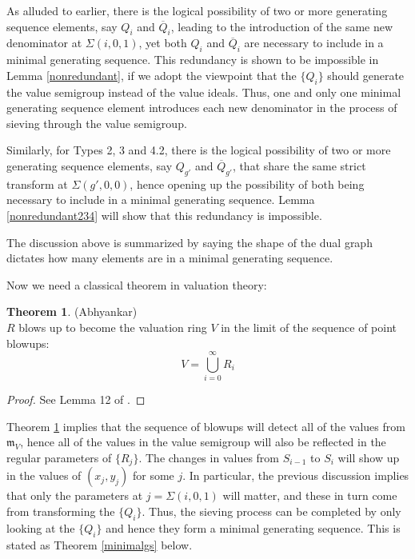 \documentclass[11pt]{amsart}
\theoremstyle{definition}
\newtheorem{thm}{Theorem}[section]
\begin{document}
{As alluded to earlier, there is the logical possibility of two or more generating sequence elements, say $Q_i$ and $\overline Q_i$, leading to the introduction of the same new denominator at $\Sigma(i,0,1)$, yet both $Q_i$ and $\overline Q_i$ are necessary to include in a minimal generating sequence. This redundancy is shown to be impossible in Lemma \ref{nonredundant}, if we adopt the viewpoint that the $\{Q_i\}$ should generate the value semigroup instead of the value ideals. Thus, one and only one minimal generating sequence element introduces each new denominator in the process of sieving through the value semigroup.

Similarly, for Types 2, 3 and 4.2, there is the logical possibility of two or more generating sequence elements, say $Q_{g'}$ and $\overline Q_{g'}$, that share the same strict transform at $\Sigma(g',0,0)$, hence opening up the possibility of both being necessary to include in a minimal generating sequence. Lemma \ref{nonredundant234} will show that this redundancy is impossible.

The discussion above is summarized by saying the shape of the dual graph dictates how many elements are in a minimal generating sequence.

Now we need a classical theorem in valuation theory:

\begin{thm}(Abhyankar) \label{lu}
\\
$R$ blows up to become the valuation ring $V$ in the limit of the sequence of point blowups:
\begin{equation*}
V=\bigcup_{i=0}^\infty R_i
\end{equation*}
\end{thm}

\begin{proof}
See Lemma 12 of \cite{ab}.
\end{proof}

Theorem \ref{lu} implies that the sequence of blowups will detect all of the values from $\mathfrak{m}_V$, hence all of the values in the value semigroup will also be reflected in the regular parameters of $\{R_j\}$. The changes in values from $S_{i-1}$ to $S_i$ will show up in the values of $(x_j,y_j)$ for some $j$. In particular, the previous discussion implies that only the parameters at $j=\Sigma(i,0,1)$ will matter, and these in turn come from transforming the $\{Q_i\}$. Thus, the sieving process can be completed by only looking at the $\{Q_i\}$ and hence they form a minimal generating sequence. This is stated as Theorem \ref{minimalgs} below.

}
\end{document}
